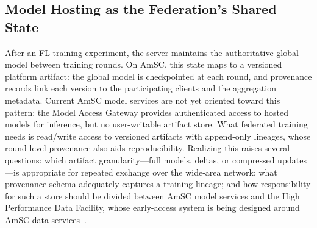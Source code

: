 \documentclass[conference]{IEEEtran}
\begin{document}
\subsection{Model Hosting as the Federation's Shared State}
After an FL training experiment, the server maintains the authoritative global model between training rounds. On AmSC, this state maps to a versioned platform artifact: the global model is checkpointed at each round, and provenance records link each version to the participating clients and the aggregation metadata. Current AmSC model services are not yet oriented toward this pattern: the Model Access Gateway provides authenticated access to hosted models for inference, but no user-writable artifact store. What federated training needs is read/write access to versioned artifacts with append-only lineages, whose round-level provenance also aids reproducibility. Realizing this raises several questions: which artifact granularity---full models, deltas, or compressed updates---is appropriate for repeated exchange over the wide-area network; what provenance schema adequately captures a training lineage; and how responsibility for such a store should be divided between AmSC model services and the High Performance Data Facility, whose early-access system is being designed around AmSC data services~\cite{doe2026scac}.




\end{document}
